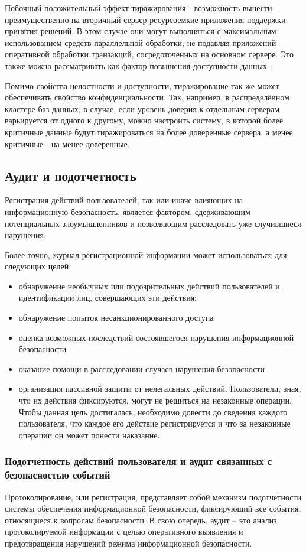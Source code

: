 Побочный положительный эффект тиражирования - возможность вынести преимущественно на вторичный
сервер ресурсоемкие приложения поддержки принятия решений. В этом случае они могут выполняться с
максимальным использованием средств параллельной обработки, не подавляя приложений оперативной
обработки транзакций, сосредоточенных на основном сервере. Это также можно рассматривать как фактор
повышения доступности данных \cite{data-replication}.

Помимо свойства целостности и доступности, тиражирование так же может обеспечивать свойство
конфиденциальности. Так, например, в распределённом кластере баз данных, в случае, если уровень
доверия к отдельным серверам варьируется от одного к другому, можно настроить систему, в
которой более критичные данные будут тиражироваться на более доверенные сервера, а менее
критичные - на менее доверенные.


\subsection{Аудит и подотчетность}
Регистрация действий пользователей, так или иначе влияющих на информационную безопасность, является
фактором, сдерживающим потенциальных злоумышленников и позволяющим расследовать уже случившиеся нарушения.

Более точно, журнал регистрационной информации может использоваться для следующих целей:
\begin{itemize}
    \item обнаружение необычных или подозрительных действий пользователей и идентификации лиц,
        совершающих эти действия;
    \item обнаружение попыток несанкционированного доступа
    \item оценка возможных последствий состоявшегося нарушения информационной безопасности
    \item оказание помощи в расследовании случаев нарушения безопасности
    \item организация пассивной защиты от нелегальных действий. Пользователи, зная, что их действия
        фиксируются, могут не решиться на незаконные операции. Чтобы данная цель достигалась,
        необходимо довести до сведения каждого пользователя, что каждое его действие регистрируется
        и что за незаконные операции он может понести наказание.
\end{itemize}


\subsubsection{Подотчетность действий пользователя и аудит связанных с безопасностью событий}
Протоколирование, или регистрация, представляет собой механизм подотчётности системы обеспечения
информационной безопасности, фиксирующий все события, относящиеся к вопросам безопасности. В свою
очередь, аудит – это анализ протоколируемой информации с целью оперативного выявления и
предотвращения нарушений режима информационной безопасности.

